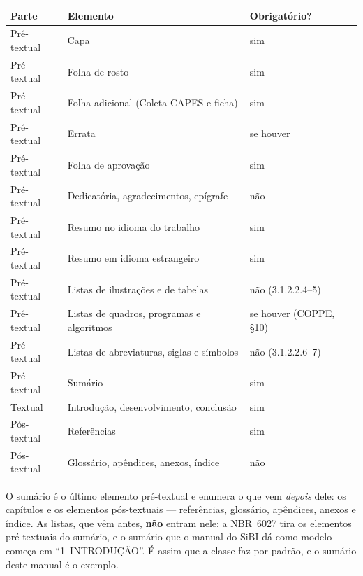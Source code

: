 \documentclass[dsc]{ufrj}
\begin{document}
  \begin{framefloat}[ht]
    \centering
    \caption{Ordem dos elementos do trabalho}
    \label{qua:estrutura}
    \begin{tabular}{|l|l|l|}
      \hline
      \textbf{Parte} & \textbf{Elemento} & \textbf{Obrigatório?} \\
      \hline
      Pré-textual & Capa & sim \\
      \hline
      Pré-textual & Folha de rosto & sim \\
      \hline
      Pré-textual & Folha adicional (Coleta CAPES e ficha) & sim \\
      \hline
      Pré-textual & Errata & se houver \\
      \hline
      Pré-textual & Folha de aprovação & sim \\
      \hline
      Pré-textual & Dedicatória, agradecimentos, epígrafe & não \\
      \hline
      Pré-textual & Resumo no idioma do trabalho & sim \\
      \hline
      Pré-textual & Resumo em idioma estrangeiro & sim \\
      \hline
      Pré-textual & Listas de ilustrações e de tabelas & não (3.1.2.2.4--5) \\
      \hline
      Pré-textual & Listas de quadros, programas e algoritmos & se houver (COPPE, §10) \\
      \hline
      Pré-textual & Listas de abreviaturas, siglas e símbolos & não (3.1.2.2.6--7) \\
      \hline
      Pré-textual & Sumário & sim \\
      \hline
      Textual & Introdução, desenvolvimento, conclusão & sim \\
      \hline
      Pós-textual & Referências & sim \\
      \hline
      Pós-textual & Glossário, apêndices, anexos, índice & não \\
      \hline
    \end{tabular}
  \end{framefloat}

  O sumário é o último elemento pré-textual e enumera o que vem \emph{depois}
  dele: os capítulos e os elementos pós-textuais --- referências, glossário,
  apêndices, anexos e índice. As listas, que vêm antes, \textbf{não} entram
  nele: a \mbox{NBR~6027} tira os elementos pré-textuais do sumário, e o sumário
  que o manual do SiBI dá como modelo começa em ``1~INTRODUÇÃO''. É assim que a
  classe faz por padrão, e o sumário deste manual é o exemplo.
\end{document}
